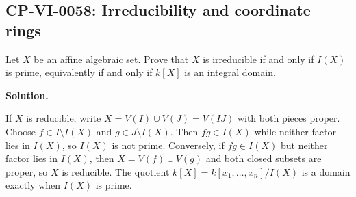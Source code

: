 
\subsection*{CP-VI-0058: Irreducibility and coordinate rings}

Let $X$ be an affine algebraic set. Prove that $X$ is irreducible if and only if $I(X)$ is prime, equivalently if and only if $k[X]$ is an integral domain.

\medskip
\noindent\textbf{Solution.}

If $X$ is reducible, write $X=V(I)\cup V(J)=V(IJ)$ with both pieces proper. Choose $f\in I\setminus I(X)$ and $g\in J\setminus I(X)$. Then $fg\in I(X)$ while neither factor lies in $I(X)$, so $I(X)$ is not prime. Conversely, if $fg\in I(X)$ but neither factor lies in $I(X)$, then $X=V(f)\cup V(g)$ and both closed subsets are proper, so $X$ is reducible. The quotient $k[X]=k[x_1,\dots,x_n]/I(X)$ is a domain exactly when $I(X)$ is prime.
